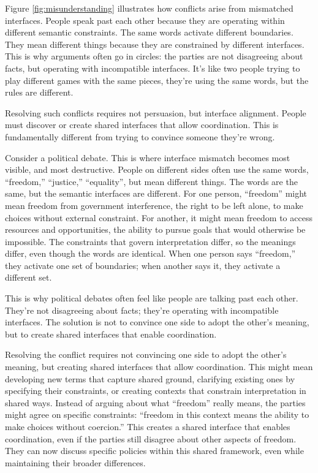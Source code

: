 \documentclass[
  openright]{book}
\begin{document}
Figure \ref{fig:misunderstanding} illustrates how conflicts arise from
mismatched interfaces. People speak past each other because they are
operating within different semantic constraints. The same words activate
different boundaries. They mean different things because they are
constrained by different interfaces. This is why arguments often go in
circles: the parties are not disagreeing about facts, but operating with
incompatible interfaces. It's like two people trying to play different
games with the same pieces, they're using the same words, but the rules
are different.

Resolving such conflicts requires not persuasion, but interface
alignment. People must discover or create shared interfaces that allow
coordination. This is fundamentally different from trying to convince
someone they're wrong.

Consider a political debate. This is where interface mismatch becomes
most visible, and most destructive. People on different sides often use
the same words, ``freedom,'' ``justice,'' ``equality'', but mean
different things. The words are the same, but the semantic interfaces
are different. For one person, ``freedom'' might mean freedom from
government interference, the right to be left alone, to make choices
without external constraint. For another, it might mean freedom to
access resources and opportunities, the ability to pursue goals that
would otherwise be impossible. The constraints that govern
interpretation differ, so the meanings differ, even though the words are
identical. When one person says ``freedom,'' they activate one set of
boundaries; when another says it, they activate a different set.

This is why political debates often feel like people are talking past
each other. They're not disagreeing about facts; they're operating with
incompatible interfaces. The solution is not to convince one side to
adopt the other's meaning, but to create shared interfaces that enable
coordination.

Resolving the conflict requires not convincing one side to adopt the
other's meaning, but creating shared interfaces that allow coordination.
This might mean developing new terms that capture shared ground,
clarifying existing ones by specifying their constraints, or creating
contexts that constrain interpretation in shared ways. Instead of
arguing about what ``freedom'' really means, the parties might agree on
specific constraints: ``freedom in this context means the ability to
make choices without coercion.'' This creates a shared interface that
enables coordination, even if the parties still disagree about other
aspects of freedom. They can now discuss specific policies within this
shared framework, even while maintaining their broader differences.
\end{document}
